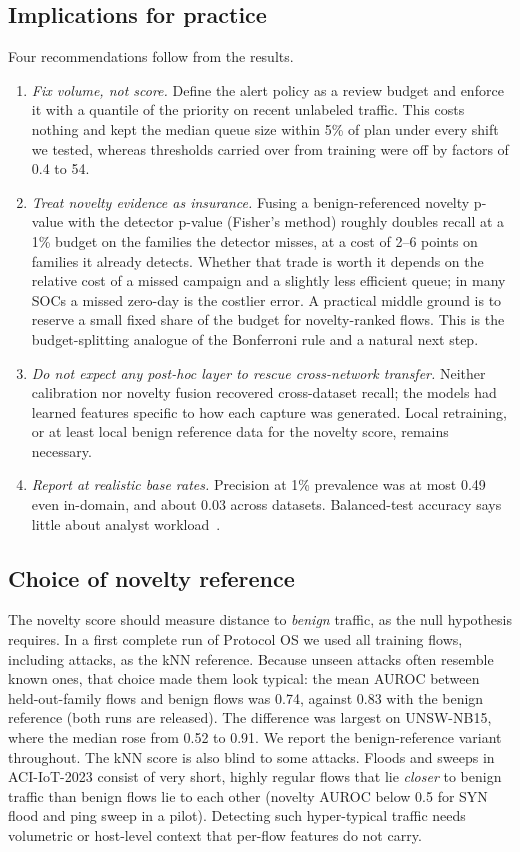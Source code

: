\subsection{Implications for practice}
Four recommendations follow from the results.
\begin{enumerate}
\item \emph{Fix volume, not score.} Define the alert policy as a review budget and enforce it with a quantile of the priority on recent unlabeled traffic. This costs nothing and kept the median queue size within 5\% of plan under every shift we tested, whereas thresholds carried over from training were off by factors of 0.4 to 54.
\item \emph{Treat novelty evidence as insurance.} Fusing a benign-referenced novelty p-value with the detector p-value (Fisher's method) roughly doubles recall at a 1\% budget on the families the detector misses, at a cost of 2--6 points on families it already detects. Whether that trade is worth it depends on the relative cost of a missed campaign and a slightly less efficient queue; in many SOCs a missed zero-day is the costlier error. A practical middle ground is to reserve a small fixed share of the budget for novelty-ranked flows. This is the budget-splitting analogue of the Bonferroni rule and a natural next step.
\item \emph{Do not expect any post-hoc layer to rescue cross-network transfer.} Neither calibration nor novelty fusion recovered cross-dataset recall; the models had learned features specific to how each capture was generated. Local retraining, or at least local benign reference data for the novelty score, remains necessary.
\item \emph{Report at realistic base rates.} Precision at 1\% prevalence was at most 0.49 even in-domain, and about 0.03 across datasets. Balanced-test accuracy says little about analyst workload~\cite{axelsson2000base,alahmadi2022falsepositives}.
\end{enumerate}

\subsection{Choice of novelty reference}
The novelty score should measure distance to \emph{benign} traffic, as the null hypothesis requires. In a first complete run of Protocol OS we used all training flows, including attacks, as the kNN reference. Because unseen attacks often resemble known ones, that choice made them look typical: the mean AUROC between held-out-family flows and benign flows was 0.74, against 0.83 with the benign reference (both runs are released). The difference was largest on UNSW-NB15, where the median rose from 0.52 to 0.91. We report the benign-reference variant throughout. The kNN score is also blind to some attacks. Floods and sweeps in ACI-IoT-2023 consist of very short, highly regular flows that lie \emph{closer} to benign traffic than benign flows lie to each other (novelty AUROC below 0.5 for SYN flood and ping sweep in a pilot). Detecting such hyper-typical traffic needs volumetric or host-level context that per-flow features do not carry.


